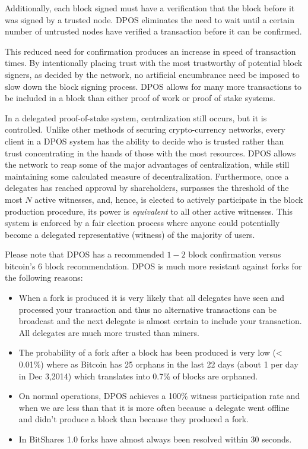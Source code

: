 Additionally, each block signed must have a verification that the block
before it was signed by a trusted node. DPOS eliminates the need to wait until
a certain number of untrusted nodes have verified a transaction before it can
be confirmed.

This reduced need for confirmation produces an increase in speed of transaction
times. By intentionally placing trust with the most trustworthy of potential
block signers, as decided by the network, no artificial encumbrance need be
imposed to slow down the block signing process. DPOS allows for many more
transactions to be included in a block than either proof of work or proof of
stake systems.

In a delegated proof-of-stake system, centralization still occurs, but it is
controlled. Unlike other methods of securing crypto-currency networks, every
client in a DPOS system has the ability to decide who is trusted rather than
trust concentrating in the hands of those with the most resources. DPOS allows
the network to reap some of the major advantages of centralization, while still
maintaining some calculated measure of decentralization. Furthermore, once a
delegates has reached approval by shareholders, surpasses the threshold of the
most $N$ active witnesses, and, hence, is elected to actively participate in
the block production procedure, its power is \emph{equivalent} to all other
active witnesses. This system is enforced by a fair election process where
anyone could potentially become a delegated representative (witness) of the
majority of users.

Please note that DPOS has a recommended $1-2$ block confirmation versus
bitcoin's 6 block recommendation. DPOS is much more resistant against forks for
the following reasons:
\begin{itemize}
\item When a fork is produced it is
      very likely that all delegates have seen and processed your transaction and
      thus no alternative transactions can be broadcast and the next delegate is
      almost certain to include your transaction.  All delegates are much more
      trusted than miners.
\item The probability of a fork after a block has been produced is very low (<
      0.01\%) where as Bitcoin has 25 orphans in the last 22 days (about 1 per day in
      Dec 3,2014) which translates into 0.7\% of blocks are orphaned.
\item On normal operations, DPOS achieves a 100\% witness participation rate and when
      we are less than that it is more often because a delegate went offline and didn't
      produce a block than because they produced a fork. 
\item In BitShares 1.0 forks have almost always been resolved within 30 seconds. 
\end{itemize}


